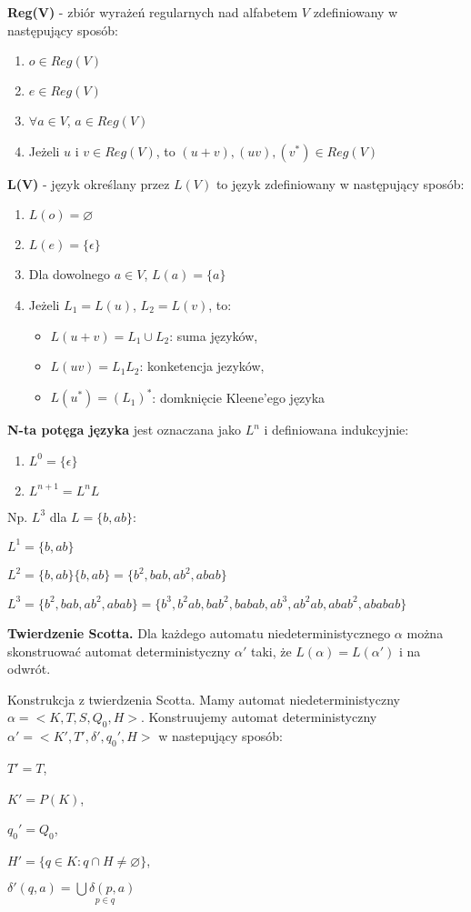 \documentclass{mwart}
\begin{document}
\textbf{Reg(V)} - zbiór wyrażeń regularnych nad alfabetem $V$ zdefiniowany w następujący sposób:
\begin{enumerate}[label={(\roman*)}]
\item $o \in Reg(V)$
\item $e \in Reg(V)$
\item $\forall a \in V$, $a \in Reg(V)$
\item Jeżeli $u$ i $v \in  Reg(V)$, to $(u+v), (uv), (v^{*}) \in Reg(V)$
\end{enumerate}\medskip

\textbf{L(V)} - język określany przez $L(V)$ to język zdefiniowany w następujący sposób:
\begin{enumerate}[label={(\roman*)}]
\item $L(o) = \varnothing$
\item $L(e) = \{\epsilon\}$
\item Dla dowolnego $a \in V$, $L(a) = \{a\}$
\item Jeżeli $L_{1} = L(u)$, $L_{2} = L(v)$, to:
\begin{itemize}
\item $L(u+v) = L_{1} \cup L_{2}$: suma języków,
\item $L(uv) = L_{1}L_{2}$: konketencja jezyków,
\item $L(u^{*}) = (L_{1})^{*}$: domknięcie Kleene'ego języka
\end{itemize}
\end{enumerate}\medskip

\textbf{N-ta potęga języka} jest oznaczana jako $L^{n}$ i definiowana indukcyjnie:
\begin{enumerate}[label={(\roman*)}]
\item $L^{0} = \{\epsilon\}$
\item $L^{n+1} = L^{n}L$
\end{enumerate}
Np. $L^{3}$ dla $L = \{b, ab\}$:\par
$L^{1} = \{b, ab\}$\par
$L^{2} = \{b, ab\}\{b, ab\} = \{b^{2}, bab, ab^{2}, abab\}$\par
$L^{3} = \{b^{2}, bab, ab^{2}, abab\} = \{b^{3}, b^{2}ab, bab^{2}, babab, ab^{3}, ab^{2}ab, abab^{2}, ababab\}$\medskip

\textbf{Twierdzenie Scotta.} Dla każdego automatu niedeterministycznego $\alpha$ można skonstruować automat deterministyczny $\alpha'$ taki, że $L(\alpha) = L(\alpha')$ i na odwrót.\par
Konstrukcja z twierdzenia Scotta. Mamy automat niedeterministyczny $\alpha = < K, T, S, Q_{0}, H >$. Konstruujemy automat deterministyczny $\alpha' = <K', T', \delta', q_{0}', H>$ w nastepujący sposób:\par
$T ' = T$,\par
$K' = P(K)$,\par
$q_{0}' = Q_{0}$,\par
$H' = \{q \in K: q \cap H \neq \varnothing \}$,\par
$\delta'(q,a) = \underset{p \in q}{\bigcup\delta(p,a)}$
\end{document}

